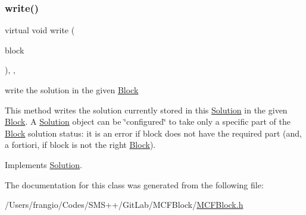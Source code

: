 \mbox{\label{class_s_m_spp__di__unipi__it_1_1_m_c_f_solution_ad3aad23f258ee59d0c21f1fa6ecdc6fe}} 
\subsubsection{\texorpdfstring{write()}{write()}}
{\footnotesize\ttfamily virtual void write (\begin{DoxyParamCaption}\item[{\mbox{\hyperlink{class_s_m_spp__di__unipi__it_1_1_block}{Block}} $\ast$const}]{block }\end{DoxyParamCaption})\hspace{0.3cm}{\ttfamily [final]}, {\ttfamily [override]}, {\ttfamily [virtual]}}



write the solution in the given \mbox{\hyperlink{class_s_m_spp__di__unipi__it_1_1_block}{Block}} 

This method writes the solution currently stored in this \mbox{\hyperlink{class_s_m_spp__di__unipi__it_1_1_solution}{Solution}} in the given \mbox{\hyperlink{class_s_m_spp__di__unipi__it_1_1_block}{Block}}. A \mbox{\hyperlink{class_s_m_spp__di__unipi__it_1_1_solution}{Solution}} object can be \char`\"{}configured\char`\"{} to take only a specific part of the \mbox{\hyperlink{class_s_m_spp__di__unipi__it_1_1_block}{Block}} solution status\+: it is an error if block does not have the required part (and, a fortiori, if block is not the right \mbox{\hyperlink{class_s_m_spp__di__unipi__it_1_1_block}{Block}}). 

Implements \mbox{\hyperlink{class_s_m_spp__di__unipi__it_1_1_solution_a6ba3f1b8f44f35e6a56fc0795587f68a}{Solution}}.



The documentation for this class was generated from the following file\+:\begin{DoxyCompactItemize}
\item 
/\+Users/frangio/\+Codes/\+S\+M\+S++/\+Git\+Lab/\+M\+C\+F\+Block/\mbox{\hyperlink{_m_c_f_block_8h}{M\+C\+F\+Block.\+h}}\end{DoxyCompactItemize}
